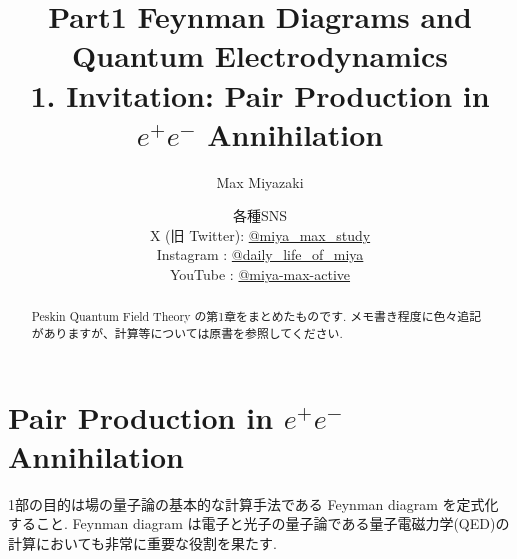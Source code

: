 \documentclass[12pt]{jsarticle}
\title{Part1 Feynman Diagrams and Quantum Electrodynamics\\
1. Invitation: Pair Production in $e^+ e^-$ Annihilation}
\date{各種SNS\\
    X (旧 Twitter): \href{https://x.com/miya_max_study}{@miya\_max\_study}\\
    Instagram : \href{https://www.instagram.com/daily_life_of_miya/}{@daily\_life\_of\_miya}\\
    YouTube : \href{https://www.youtube.com/@miya-max-active}{@miya-max-active}
    }
\author{Max Miyazaki}
\numberwithin{equation}{section}
\begin{document}
\maketitle
\vspace{1cm}
\begin{abstract}
    Peskin Quantum Field Theory の第1章をまとめたものです. メモ書き程度に色々追記がありますが、計算等については原書を参照してください.
\end{abstract}

\newpage
\section{\textrm{Pair Production in $e^+ e^-$ Annihilation}}
1部の目的は場の量子論の基本的な計算手法である Feynman diagram を定式化すること. Feynman diagram は電子と光子の量子論である量子電磁力学(QED)の計算においても非常に重要な役割を果たす.
\end{document}
